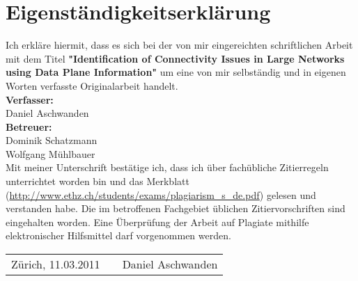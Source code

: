 
\chapter*{Eigenständigkeitserklärung}
Ich erkläre hiermit, dass es sich bei der von mir eingereichten schriftlichen Arbeit mit dem Titel \textbf{"Identification of Connectivity Issues in Large Networks using Data Plane Information"} um eine von mir selbständig und in eigenen Worten verfasste Originalarbeit handelt.\\

\vspace{5mm}
\textbf{Verfasser:}\\
Daniel Aschwanden\\

\vspace{5mm}
\textbf{Betreuer:}\\
Dominik Schatzmann\\
Wolfgang Mühlbauer\\

\vspace{5mm}
Mit meiner Unterschrift bestätige ich, dass ich über fachübliche Zitierregeln unterrichtet worden
bin und das Merkblatt (\url{http://www.ethz.ch/students/exams/plagiarism_s_de.pdf}) gelesen und
verstanden habe. Die im betroffenen Fachgebiet üblichen Zitiervorschriften sind eingehalten
worden.
Eine Überprüfung der Arbeit auf Plagiate mithilfe elektronischer Hilfsmittel darf vorgenommen
werden.\\

\vspace{15mm}
\begin{tabular}{l p{} r}
Zürich, 11.03.2011 && Daniel Aschwanden \\
\end{tabular}

\vfil